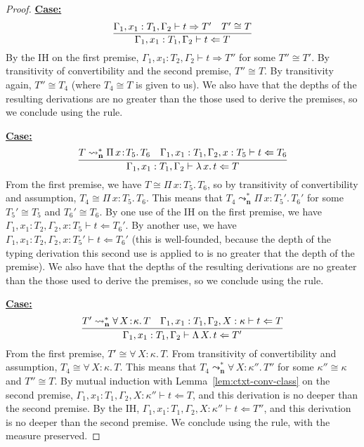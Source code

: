 \documentclass{article}
\newcommand{\abs}[4]{{#1}\, #2\! : \! #3.\, #4}
\newcommand{\absu}[3]{{#1}\, #2.\, #3}
\newcommand{\leadstocs}[0]{\ensuremath{\leadsto_{\mathbf{n}}^*}}
\newcommand{\tpcheck}[0]{\Leftarrow}
\newcommand{\tpsynth}[0]{\Rightarrow}
\newcommand{\startcase}[1]{\vspace{#1} \noindent\textbf{\underline{Case:}}}
\begin{document}
\begin{proof}
  \startcase{.2cm}
  \[
    \infer{
      \Gamma_1,x_1:T_1,\Gamma_2 \vdash t\tpcheck T
    }{
      \Gamma_1,x_1:T_1,\Gamma_2 \vdash t\tpsynth T'
      & T' \cong T
    }
  \]
  By the IH on the first premise, \(\Gamma_1,x_1:T_2,\Gamma_2 \vdash t \tpsynth
  T''\) for some \(T'' \cong T'\).
  By transitivity of convertibility and the second premise, \(T'' \cong T\).
  By transitivity again, \(T'' \cong T_4\) (where \(T_4 \cong T\) is given to
  us).
  We also have that the depths of the resulting derivations are no greater than
  the those used to derive the premises, so we conclude using the rule.
  
  \startcase{.2cm}
  \[
    \infer{
      \Gamma_1,x_1:T_1,\Gamma_2 \vdash \absu{\lambda}{x}{t} \tpcheck T
    }{
      T \leadstocs \abs{\Pi}{x}{T_5}{T_6}
      & \Gamma_1,x_1:T_1,\Gamma_2,x:T_5\vdash t\tpcheck T_6
    }
  \]
  From the first premise, we have \(T \cong \abs{\Pi}{x}{T_5}{T_6}\), so by
  transitivity of convertibility and assumption, \(T_4 \cong
  \abs{\Pi}{x}{T_5}{T_6}\).
  This means that \(T_4 \leadstocs \abs{\Pi}{x}{T_5'}{T_6'}\) for some
  \(T_5' \cong T_5\) and \(T_6' \cong T_6\).
  By one use of the IH on the first premise, we have
  \(\Gamma_1,x_1:T_2,\Gamma_2,x:T_5 \vdash t \tpcheck T_6'\).
  By another use, we have \(\Gamma_1,x_1:T_2,\Gamma_2,x:T_5' \vdash t \tpcheck
  T_6'\) (this is well-founded, because the depth of the typing derivation this
  second use is applied to is no greater that the depth of the premise).
  We also have that the depths of the resulting derivations are no greater than
  the those used to derive the premises, so we conclude using the rule.

  \startcase{.2cm}
  \[
    \infer{
      \Gamma_1,x_1:T_1,\Gamma_2 \vdash \absu{\Lambda}{X}{t} \tpcheck T'
    }{
      T' \leadstocs \abs{\forall}{X}{\kappa}{T}
      & \Gamma_1,x_1:T_1,\Gamma_2,X:\kappa \vdash t \tpcheck T
    }
  \]
  From the first premise, \(T' \cong \abs{\forall}{X}{\kappa}{T}\).
  From transitivity of convertibility and assumption, \(T_4 \cong
  \abs{\forall}{X}{\kappa}{T}\).
  This means that \(T_4 \leadstocs \abs{\forall}{X}{\kappa''}{T''}\) for
  some \(\kappa'' \cong \kappa\) and \(T'' \cong T\).
  By mutual induction with Lemma~\ref{lem:ctxt-conv-class} on the second premise,
  \(\Gamma_1,x_1:T_1,\Gamma_2,X:\kappa'' \vdash t \tpcheck T\), and this
  derivation is no deeper than the second premise.
  By the IH, \(\Gamma_1,x_1:T_1,\Gamma_2,X:\kappa'' \vdash t \tpcheck T''\), and
  this derivation is no deeper than the second premise.
  We conclude using the rule, with the measure preserved.


\end{proof}
\end{document}
